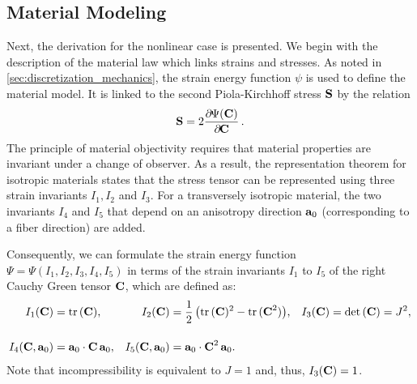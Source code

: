 \subsection{Material Modeling}
%
Next, the derivation for the nonlinear case is presented. We begin with the description of the material law which links strains and stresses.
As noted in \cref{sec:discretization_mechanics}, the strain energy function $\psi$ is used to define the material model. It is linked to the second Piola-Kirchhoff stress $\textbf{S}$ by the relation%
\begin{align}\label{eq:material_model_helper1}
  \bfS = 2\p{\Psi(\bfC)}{\bfC}.
\end{align}
The principle of material objectivity requires that material properties are invariant under a change of observer. As a result, the representation theorem for isotropic materials states that the stress tensor can be represented using three strain invariants $I_1, I_2$ and $I_3$. For a transversely isotropic material, the two invariants $I_4$ and $I_5$ that depend on an anisotropy direction $\textbf{a}_0$ (corresponding to a fiber direction) are added.

Consequently, we can formulate the strain energy function $\Psi=\Psi(I_1,I_2,I_3,I_4,I_5)$ in terms of the strain invariants $I_1$ to $I_5$ of the right Cauchy Green tensor $\textbf{C}$, which are defined as:
\begin{align*}
  I_1(\textbf{C}) &= \hbox{tr} \,(\textbf{C}),  &
  I_2(\textbf{C}) &= \displaystyle\frac{\displaystyle{1}}{\displaystyle{2}}\,\big(\hbox{tr} \,(\textbf{C})^2 - \hbox{tr} \,(\textbf{C}^2)\big), &
  I_3(\textbf{C}) &= \hbox{det} \,(\textbf{C}) = J^2,\\[4mm]
  I_4(\textbf{C},\textbf{a}_0) &= \textbf{a}_0 \cdot \textbf{C} \, \textbf{a}_0, &
  I_5(\textbf{C},\textbf{a}_0) &= \textbf{a}_0 \cdot \textbf{C}^2 \, \textbf{a}_0. &
\end{align*}
Note that incompressibility is equivalent to $J=1$ and, thus, $I_3(\textbf{C}) = 1$. 

